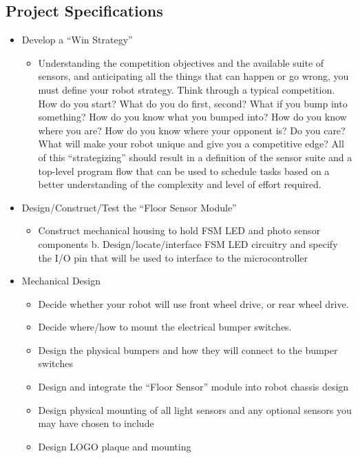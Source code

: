 \documentclass{article}
\begin{document}
\subsection{Project Specifications}
\begin{itemize}
    \item Develop a “Win Strategy”
\begin{itemize}
    \item Understanding the competition objectives and the available suite of sensors, and anticipating all the things that can happen or go wrong, you must define your robot strategy. Think through a typical competition. How do you start? What do you do first, second? What if you bump into something? How do you know what you bumped into? How do you know where you are? How do you know where your opponent is? Do you care? What will make your robot unique and give you a competitive edge? All of this “strategizing” should result in a definition of the sensor suite and a top-level program flow that can be used to schedule tasks based on a better understanding of the complexity and level of effort required.
\end{itemize}
\end{itemize}
\begin{itemize}
    \item Design/Construct/Test the “Floor Sensor Module”
\begin{itemize}
    \item Construct mechanical housing to hold FSM LED and photo sensor components b. Design/locate/interface FSM LED circuitry and specify the I/O pin that will be used to interface to the microcontroller
\end{itemize}
\end{itemize}
\begin{itemize}
\item Mechanical Design
\begin{itemize}
\item Decide whether your robot will use front wheel drive, or rear wheel drive.
\item Decide where/how to mount the electrical bumper switches.
\item Design the physical bumpers and how they will connect to the bumper switches
\item Design and integrate the “Floor Sensor” module into robot chassis design
\item Design physical mounting of all light sensors and any optional sensors you may have chosen to include
\item Design LOGO plaque and mounting
\end{itemize}
\end{itemize}
\end{document}
